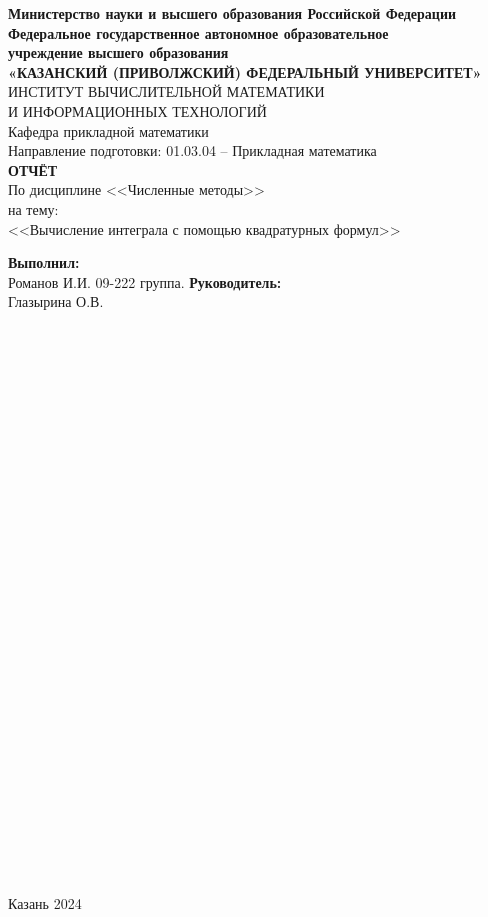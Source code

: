 \documentclass[14pt]{article}
\begin{document}
 
\begin{center}
\hfill \break
\textbf{\normalsize{Министерство науки и высшего образования Российской Федерации\\
Федеральное государственное автономное образовательное\\
учреждение высшего образования}}
\\
\normalsize{\textbf{«КАЗАНСКИЙ (ПРИВОЛЖСКИЙ) ФЕДЕРАЛЬНЫЙ УНИВЕРСИТЕТ»}}\\
\hfill \break
\normalsize{ИНСТИТУТ ВЫЧИСЛИТЕЛЬНОЙ МАТЕМАТИКИ\\ И ИНФОРМАЦИОННЫХ ТЕХНОЛОГИЙ}\\
 \hfill \break
\normalsize{Кафедра прикладной математики}\\
\hfill\break
\hfill \break
\normalsize{Направление подготовки: 01.03.04 – Прикладная математика}\\
\hfill \break
\hfill \break
\textbf{ОТЧЁТ}\\
\normalsize{По дисциплине <<Численные методы>>}\\
\normalsize{на тему:}\\
\normalsize{<<Вычисление интеграла с помощью квадратурных формул>>}\\
\hfill \break
\hfill \break
\end{center}

\hfill \break
\textbf{Выполнил:}\\Романов И.И. 09-222 группа.
\hfill \break
\hfill \break
\textbf{Руководитель:}\\Глазырина О.В.
\\
\\
\\
\\
\\
\\
\\
\\
\\
\\
\\
\\
\\
\\
\\
\\
\\
\\
\\
\\
\\
\\
\\
\\
\\
\\
\\
\\
\\
\\
\begin{center} Казань 2024 \end{center}
\thispagestyle{empty}
 
\end{document}
